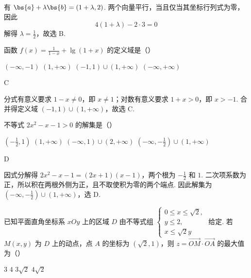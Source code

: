 \begin{solution}
有 \(\bs{a}+\lambda\bs{b}=(1+\lambda,2)\). 两个向量平行，当且仅当其坐标行列式为零，因此
\[
4(1+\lambda)-2\cdot3=0
\]
解得 \(\lambda=\frac{1}{2}\)，故选 B.
\end{solution}

\begin{problem}
函数 \( f(x) = \frac{1}{1 - x} + \lg (1 + x) \) 的定义域是（\quad）

\choices
    {\((-\infty, -1)\)}
    {\((1, +\infty)\)}
    {\((-1,1)\cup (1, + \infty)\)}
    {\((-\infty, +\infty)\)}
\end{problem}

\begin{answer}
C
\end{answer}

\begin{solution}
分式有意义要求 \(1-x\ne0\)，即 \(x\ne1\)；对数有意义要求 \(1+x>0\)，即 \(x>-1\). 合并得定义域 \((-1,1)\cup(1,+\infty)\)，故选 C.
\end{solution}

\begin{problem}
不等式 \(2x^{2} - x - 1 > 0\) 的解集是（\quad）

\choices
    {\( \left(-\frac{1}{2},1\right) \)}
    {\((1, + \infty)\)}
    {\((-\infty, 1) \cup (2, +\infty)\)}
    {\(\left(-\infty, -\frac{1}{2}\right) \cup (1, +\infty)\)}
\end{problem}

\begin{answer}
D
\end{answer}

\begin{solution}
因式分解得 \(2x^2-x-1=(2x+1)(x-1)\)，两个根为 \(-\frac{1}{2}\) 和 \(1\). 二次项系数为正，所以积在两根外侧为正，且不取使积为零的两个端点. 因此解集为 \(\left(-\infty,-\frac{1}{2}\right)\cup(1,+\infty)\)，选 D.
\end{solution}

\begin{problem}
已知平面直角坐标系 \(xOy\) 上的区域 \(D\) 由不等式组 \(\begin{cases}
0 \leqslant x \leqslant \sqrt{2},\\
y \leqslant 2,\\
x \leqslant \sqrt{2}y
\end{cases}\) 给定. 若 \(M(x, y)\) 为 \(D\) 上的动点，点 \(A\) 的坐标为 \((\sqrt{2}, 1)\)，则 \(z = \overrightarrow{OM} \cdot \overrightarrow{OA}\) 的最大值为（\quad）

\choices
    {\(3\)}
    {\(4\)}
    {\( 3\sqrt{2} \)}
    {\(4\sqrt{2}\)}
\end{problem}

